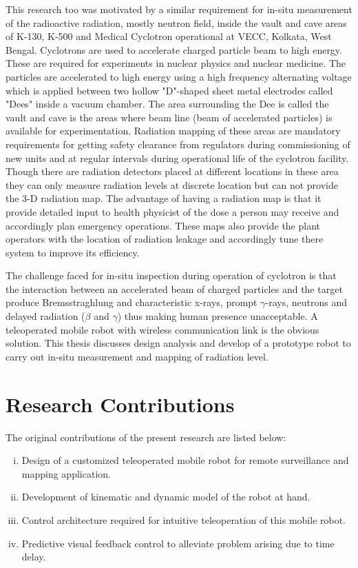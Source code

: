  This research too was motivated by a similar requirement for in-situ measurement of the radioactive radiation, mostly neutron field, inside the vault and cave areas of   K-130,  K-500  and Medical Cyclotron operational at VECC, Kolkata, West Bengal. Cyclotrons are used to accelerate  charged particle beam to high energy. These are required for experiments in nuclear physics and nuclear medicine. The particles are accelerated to high energy using a high frequency alternating voltage which is applied between two hollow "D"-shaped sheet metal electrodes called "Dees" inside a vacuum chamber. The area surrounding the Dee is called the vault  and cave is the areas where beam line (beam of  accelerated particles) is available for experimentation. Radiation mapping of these areas are  mandatory requirements for getting safety clearance from regulators during  commissioning of new units and at regular intervals during operational life of the cyclotron facility.   Though there are radiation detectors placed at different locations in these area they can only measure radiation levels at discrete location but can not provide the 3-D radiation  map. The advantage of having a  radiation map is that it  provide detailed  input to health physicist  of the dose a person may receive and accordingly plan emergency  operations. These maps also provide the plant operators with the location of radiation leakage and accordingly tune there system to improve its efficiency.

The challenge faced for in-situ inspection during operation of cyclotron is that the interaction  between  an  accelerated  beam   of  charged  particles  and  the  target  produce Bremsstraghlung and characteristic x-rays, prompt $\gamma$-rays, neutrons and delayed radiation ($\beta $ and $\gamma$) thus making human presence unacceptable.  A teleoperated mobile robot with wireless communication link is the obvious solution. This thesis discusses design analysis and develop of a prototype robot  to carry out in-situ measurement and mapping of radiation level.

\section{Research Contributions}
The original contributions of the present research are listed below:
\begin{enumerate}[(i)]

\item Design of a customized teleoperated mobile robot for remote surveillance and mapping application.
\item Development of kinematic and dynamic model of the robot at hand.
\item Control architecture required for intuitive teleoperation of this mobile robot.
\item Predictive visual feedback control to alleviate problem arising due to time delay.


\end{enumerate}
